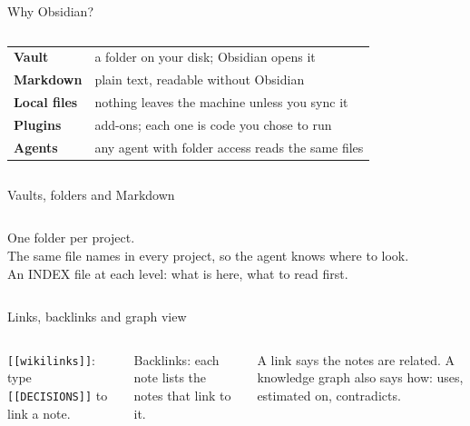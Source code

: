 
\begin{frame}{Why Obsidian?}
  \begin{columns}[c,onlytextwidth]
      \renewcommand{\arraystretch}{1.15}
      {\footnotesize
      \begin{tabularx}{\linewidth}{>{\bfseries\color{ink}}p{1.9cm} >{\leavevmode\color{dark}}X}
      Vault & a folder on your disk; Obsidian opens it\\
      Markdown & plain text, readable without Obsidian\\
      Local files & nothing leaves the machine unless you sync it\\
      Plugins & add-ons; each one is code you chose to run\\
      Agents & any agent with folder access reads the same files\\
      \end{tabularx}}
  \end{columns}
\end{frame}

\begin{frame}{Vaults, folders and Markdown}
  \begin{columns}[T,onlytextwidth]
      {\small
      One folder per project.\\[0.45em]
      The same file names in every project, so the agent knows where to look.\\[0.45em]
      An INDEX file at each level: what is here, what to read first.\par}
      \vspace{0.5em}
  \end{columns}
\end{frame}

\begin{frame}{Links, backlinks and graph view}
  \vspace{0.25em}
  \begin{columns}[T,onlytextwidth]
      {\small \texttt{[[wikilinks]]}: type \texttt{[[DECISIONS]]} to link a note.\par}
      {\small Backlinks: each note lists the notes that link to it.\par}
      {\small A link says the notes are related. A knowledge graph also says how: uses, estimated on, contradicts.\par}
  \end{columns}
\end{frame}


